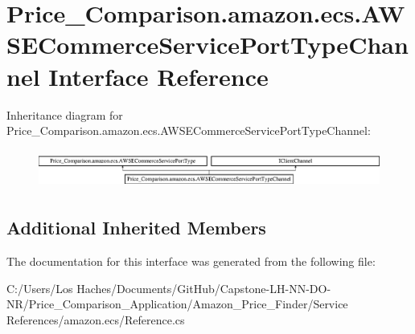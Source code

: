 \hypertarget{interface_price___comparison_1_1amazon_1_1ecs_1_1_a_w_s_e_commerce_service_port_type_channel}{\section{Price\-\_\-\-Comparison.\-amazon.\-ecs.\-A\-W\-S\-E\-Commerce\-Service\-Port\-Type\-Channel Interface Reference}
\label{interface_price___comparison_1_1amazon_1_1ecs_1_1_a_w_s_e_commerce_service_port_type_channel}
}
Inheritance diagram for Price\-\_\-\-Comparison.\-amazon.\-ecs.\-A\-W\-S\-E\-Commerce\-Service\-Port\-Type\-Channel\-:\begin{figure}[H]
\begin{center}
\leavevmode
\includegraphics[height=1.281464cm]{interface_price___comparison_1_1amazon_1_1ecs_1_1_a_w_s_e_commerce_service_port_type_channel}
\end{center}
\end{figure}
\subsection*{Additional Inherited Members}


The documentation for this interface was generated from the following file\-:\begin{DoxyCompactItemize}
\item 
C\-:/\-Users/\-Los Haches/\-Documents/\-Git\-Hub/\-Capstone-\/\-L\-H-\/\-N\-N-\/\-D\-O-\/\-N\-R/\-Price\-\_\-\-Comparison\-\_\-\-Application/\-Amazon\-\_\-\-Price\-\_\-\-Finder/\-Service References/amazon.\-ecs/Reference.\-cs\end{DoxyCompactItemize}
